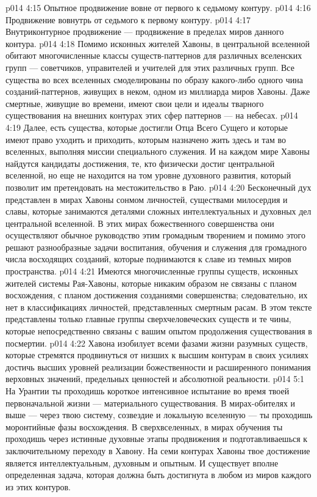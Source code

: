 \vs p014 4:15 \bibnobreakspace Опытное продвижение вовне от первого к седьмому контуру.
\vs p014 4:16 \bibnobreakspace Продвижение вовнутрь от седьмого к первому контуру.
\vs p014 4:17 \bibnobreakspace Внутриконтурное продвижение --- продвижение в пределах миров данного контура.
\vs p014 4:18 \pc Помимо исконных жителей Хавоны, в центральной вселенной обитают многочисленные классы существ\hyp{}паттернов для различных вселенских групп --- советчиков, управителей и учителей для этих различных групп. Все существа во всех вселенных смоделированы по образу какого\hyp{}либо одного чина созданий\hyp{}паттернов, живущих в неком, одном из миллиарда миров Хавоны. Даже смертные, живущие во времени, имеют свои цели и идеалы тварного существования на внешних контурах этих сфер паттернов --- на небесах.
\vs p014 4:19 Далее, есть существа, которые достигли Отца Всего Сущего и которые имеют право уходить и приходить, которым назначено жить здесь и там во вселенных, выполняя миссии специального служения. И на каждом мире Хавоны найдутся кандидаты достижения, те, кто физически достиг центральной вселенной, но еще не находится на том уровне духовного развития, который позволит им претендовать на местожительство в Раю.
\vs p014 4:20 Бесконечный дух представлен в мирах Хавоны сонмом личностей, существами милосердия и славы, которые занимаются деталями сложных интеллектуальных и духовных дел центральной вселенной. В этих мирах божественного совершенства они осуществляют обычное руководство этим громадным творением и помимо этого решают разнообразные задачи воспитания, обучения и служения для громадного числа восходящих созданий, которые поднимаются к славе из темных миров пространства.
\vs p014 4:21 Имеются многочисленные группы существ, исконных жителей системы Рая\hyp{}Хавоны, которые никаким образом не связаны с планом восхождения, с планом достижения созданиями совершенства; следовательно, их нет в классификациях личностей, представленных смертным расам. В этом тексте представлены только главные группы сверхчеловеческих существ и те чины, которые непосредственно связаны с вашим опытом продолжения существования в посмертии.
\vs p014 4:22 Хавона изобилует всеми фазами жизни разумных существ, которые стремятся продвинуться от низших к высшим контурам в своих усилиях достичь высших уровней реализации божественности и расширенного понимания верховных значений, предельных ценностей и абсолютной реальности.
\vs p014 5:1 На Урантии ты проходишь короткое интенсивное испытание во время твоей первоначальной жизни --- материального существования. В мирах\hyp{}обителях и выше --- через твою систему, созвездие и локальную вселенную --- ты проходишь моронтийные фазы восхождения. В сверхвселенных, в мирах обучения ты проходишь через истинные духовные этапы продвижения и подготавливаешься к заключительному переходу в Хавону. На семи контурах Хавоны твое достижение является интеллектуальным, духовным и опытным. И существует вполне определенная задача, которая должна быть достигнута в любом из миров каждого из этих контуров.

